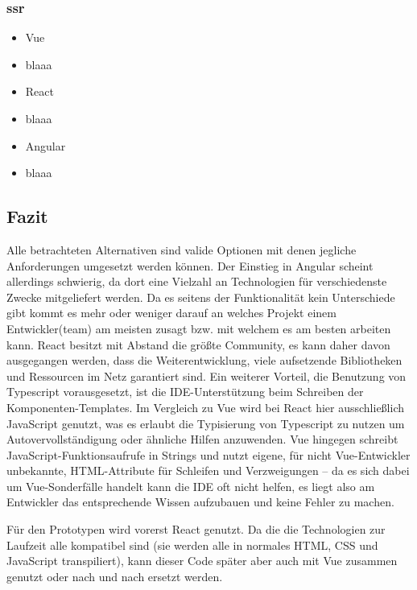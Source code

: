 \subsubsection{\acrlong{ssr}}
\begin{itemize}
    \item{Vue}
    \item[] blaaa
    \item{React}
    \item[] blaaa
    \item{Angular}
    \item[] blaaa 
\end{itemize}

\subsection{Fazit}
Alle betrachteten Alternativen sind valide Optionen mit denen jegliche Anforderungen umgesetzt werden können. Der Einstieg in Angular scheint allerdings schwierig, da dort eine Vielzahl an Technologien für verschiedenste Zwecke mitgeliefert werden. Da es seitens der Funktionalität kein Unterschiede gibt kommt es mehr oder weniger darauf an welches Projekt einem Entwickler(team) am meisten zusagt bzw. mit welchem es am besten arbeiten kann.
React besitzt mit Abstand die größte Community, es kann daher davon ausgegangen werden, dass die Weiterentwicklung, viele aufsetzende Bibliotheken und Ressourcen im Netz garantiert sind. Ein weiterer Vorteil, die Benutzung von Typescript vorausgesetzt, ist die IDE-Unterstützung beim Schreiben der Komponenten-Templates. Im Vergleich zu Vue wird bei React hier ausschließlich JavaScript genutzt, was es erlaubt die Typisierung von Typescript zu nutzen um Autovervollständigung oder ähnliche Hilfen anzuwenden. Vue hingegen schreibt JavaScript-Funktionsaufrufe in Strings und nutzt eigene, für nicht Vue-Entwickler unbekannte, HTML-Attribute für Schleifen und Verzweigungen -- da es sich dabei um Vue-Sonderfälle handelt kann die IDE oft nicht helfen, es liegt also am Entwickler das entsprechende Wissen aufzubauen und keine Fehler zu machen.

Für den Prototypen wird vorerst React genutzt. Da die die Technologien zur Laufzeit alle kompatibel sind (sie werden alle in normales HTML, CSS und JavaScript transpiliert), kann dieser Code später aber auch mit Vue zusammen genutzt oder nach und nach ersetzt werden.

